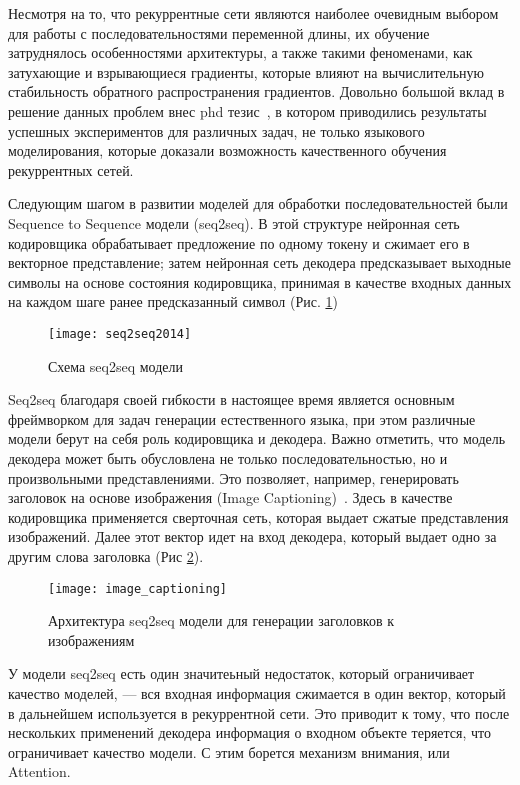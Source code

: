 Несмотря на то, что рекуррентные сети являются наиболее очевидным выбором для работы с последовательностями переменной длины, их обучение затруднялось особенностями архитектуры, а также такими феноменами, как затухающие и взрывающиеся градиенты, которые влияют на вычислительную стабильность обратного распространения градиентов. Довольно большой вклад в решение данных проблем внес phd тезис~\cite{sutskever2013training}, в котором приводились результаты успешных экспериментов для различных задач, не только языкового моделирования, которые доказали возможность качественного обучения рекуррентных сетей.

Следующим шагом в развитии моделей для обработки последовательностей были Sequence to Sequence модели (seq2seq). В этой структуре нейронная сеть кодировщика обрабатывает предложение по одному токену и сжимает его в векторное представление; затем нейронная сеть декодера предсказывает выходные символы на основе состояния кодировщика, принимая в качестве входных данных на каждом шаге ранее предсказанный символ (Рис. \ref{fig:seq2seq})

\begin{figure}[ht]
	\centering
	\texttt{[image: seq2seq2014]}  
	\caption{ Схема seq2seq модели }
	\label{fig:seq2seq}
\end{figure}

Seq2seq благодаря своей гибкости в настоящее время является основным фреймворком для задач генерации естественного языка, при этом различные модели берут на себя роль кодировщика и декодера. Важно отметить, что модель декодера может быть обусловлена не только последовательностью, но и произвольными представлениями. Это позволяет, например, генерировать заголовок на основе изображения (Image Captioning)~\cite{image-captioning}. Здесь в качестве кодировщика применяется сверточная сеть, которая выдает сжатые представления изображений. Далее этот вектор идет на вход декодера, который выдает одно за другим слова заголовка (Рис \ref{fig:image_captioning}).
\begin{figure}[ht]
	\centering
	\texttt{[image: image\_captioning]}  
	\caption{ Архитектура seq2seq модели для генерации заголовков к изображениям }
	\label{fig:image_captioning}
\end{figure}

У модели seq2seq есть один значитеьный недостаток, который ограничивает качество моделей, --- вся входная информация сжимается в один вектор, который в дальнейшем используется в рекуррентной сети. Это приводит к тому, что после нескольких применений декодера информация о входном объекте теряется, что ограничивает качество модели. С этим борется механизм внимания, или Attention.

